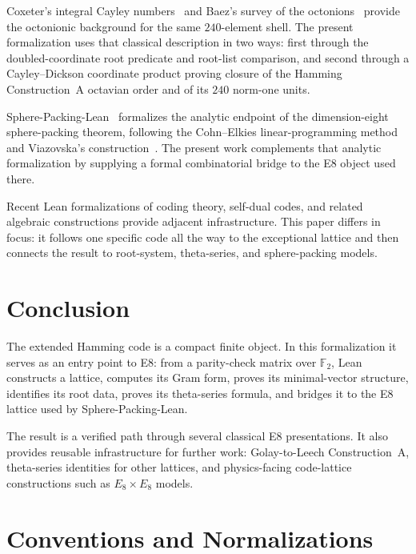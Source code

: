 \documentclass[12pt]{article}
\theoremstyle{definition}
\newcommand{\F}{\mathbb{F}}
\begin{document}
Coxeter's integral Cayley numbers~\cite{Coxeter1946} and Baez's survey of the
octonions~\cite{Baez2002} provide the octonionic background for the same
$240$-element shell.  The present formalization uses that classical description
in two ways: first through the doubled-coordinate root predicate and root-list
comparison, and second through a Cayley--Dickson coordinate product proving
closure of the Hamming Construction~A octavian order and of its $240$ norm-one
units.

Sphere-Packing-Lean~\cite{SPL2025} formalizes the analytic endpoint of the
dimension-eight sphere-packing theorem, following the Cohn--Elkies
linear-programming method~\cite{CohnElkies2003} and Viazovska's
construction~\cite{Viazovska2017}.  The present work complements that analytic
formalization by supplying a formal combinatorial bridge to the E8 object used
there.

Recent Lean formalizations of coding theory, self-dual codes, and related
algebraic constructions provide adjacent infrastructure.  This paper differs in
focus: it follows one specific code all the way to the exceptional lattice and
then connects the result to root-system, theta-series, and sphere-packing
models.

\section{Conclusion}
\label{sec:conclusion}

The extended Hamming code is a compact finite object.  In this formalization it
serves as an entry point to E8: from a parity-check matrix over $\F_2$, Lean
constructs a lattice, computes its Gram form, proves its minimal-vector
structure, identifies its root data, proves its theta-series formula, and
bridges it to the E8 lattice used by Sphere-Packing-Lean.

The result is a verified path through several classical E8 presentations.  It
also provides reusable infrastructure for further work: Golay-to-Leech
Construction~A, theta-series identities for other lattices, and physics-facing
code-lattice constructions such as $E_8\times E_8$ models.

\appendix

\section{Conventions and Normalizations}
\label{app:conventions}
\end{document}
